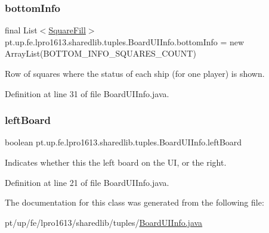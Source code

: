 \hypertarget{classpt_1_1up_1_1fe_1_1lpro1613_1_1sharedlib_1_1tuples_1_1_board_u_i_info_a403e4e6523593c1b782df7cdccaa6779}{}\label{classpt_1_1up_1_1fe_1_1lpro1613_1_1sharedlib_1_1tuples_1_1_board_u_i_info_a403e4e6523593c1b782df7cdccaa6779} 
\subsubsection{\texorpdfstring{bottom\+Info}{bottomInfo}}
{\footnotesize\ttfamily final List$<$\hyperlink{enumpt_1_1up_1_1fe_1_1lpro1613_1_1sharedlib_1_1tuples_1_1_board_u_i_info_1_1_square_fill}{Square\+Fill}$>$ pt.\+up.\+fe.\+lpro1613.\+sharedlib.\+tuples.\+Board\+U\+I\+Info.\+bottom\+Info = new Array\+List(B\+O\+T\+T\+O\+M\+\_\+\+I\+N\+F\+O\+\_\+\+S\+Q\+U\+A\+R\+E\+S\+\_\+\+C\+O\+U\+NT)}

Row of squares where the status of each ship (for one player) is shown. 

Definition at line 31 of file Board\+U\+I\+Info.\+java.

\hypertarget{classpt_1_1up_1_1fe_1_1lpro1613_1_1sharedlib_1_1tuples_1_1_board_u_i_info_a2433a0822ba65fcc939b72c4dee5b0a9}{}\label{classpt_1_1up_1_1fe_1_1lpro1613_1_1sharedlib_1_1tuples_1_1_board_u_i_info_a2433a0822ba65fcc939b72c4dee5b0a9} 
\subsubsection{\texorpdfstring{left\+Board}{leftBoard}}
{\footnotesize\ttfamily boolean pt.\+up.\+fe.\+lpro1613.\+sharedlib.\+tuples.\+Board\+U\+I\+Info.\+left\+Board}

Indicates whether this the left board on the UI, or the right. 

Definition at line 21 of file Board\+U\+I\+Info.\+java.



The documentation for this class was generated from the following file\+:\begin{DoxyCompactItemize}
\item 
pt/up/fe/lpro1613/sharedlib/tuples/\hyperlink{_board_u_i_info_8java}{Board\+U\+I\+Info.\+java}\end{DoxyCompactItemize}
